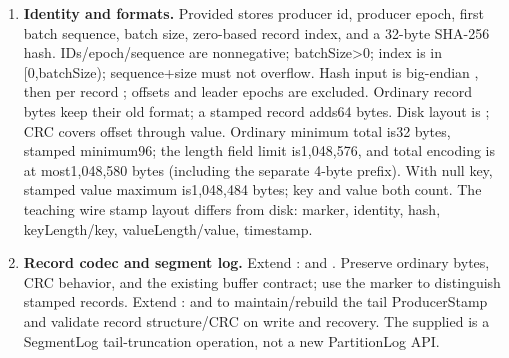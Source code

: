\begin{enumerate}
\item \textbf{Identity and formats.} Provided  stores producer id, producer epoch, first batch sequence, batch size, zero-based record index, and a 32-byte SHA-256 hash. IDs/epoch/sequence are nonnegative; batchSize>0; index is in [0,batchSize); sequence+size must not overflow. Hash input is big-endian , then per record ; offsets and leader epochs are excluded. Ordinary record bytes keep their old format; a stamped record adds64 bytes. Disk layout is ; CRC covers offset through value. Ordinary minimum total is32 bytes, stamped minimum96; the length field limit is1,048,576, and total encoding is at most1,048,580 bytes (including the separate 4-byte prefix). With null key, stamped value maximum is1,048,484 bytes; key and value both count. The teaching wire stamp layout differs from disk: marker, identity, hash, keyLength/key, valueLength/value, timestamp.
\item \textbf{Record codec and segment log.} Extend :  and . Preserve ordinary bytes, CRC behavior, and the existing buffer contract; use the marker to distinguish stamped records. Extend :  and  to maintain/rebuild the tail ProducerStamp and validate record structure/CRC on write and recovery. The supplied  is a SegmentLog tail-truncation operation, not a new PartitionLog API.

\end{enumerate}
